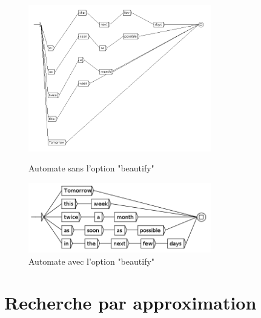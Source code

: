 \begin{figure}[h!]
	\begin{minipage}[h!]{0.5\linewidth}
		\centering
		\includegraphics[width=8cm]{resources/img/fig8-5GRFnoBeautify.png}	
		\caption{Automate sans l'option "beautify"\label{fig8-5GRFnoBeautify}}
	\end{minipage}
	\hspace{0.1cm}
	\begin{minipage}[h!]{0.5\linewidth}
		\centering
		\includegraphics[width=8cm]{resources/img/fig8-6GRFBeautify.png}
		\caption{Automate avec l'option "beautify"\label{fig8-6GRFBeautify}}
	\end{minipage}
	\hspace{0.1cm}
\end{figure}
\pagebreak


\section{Recherche par approximation}
\label{approximation}

